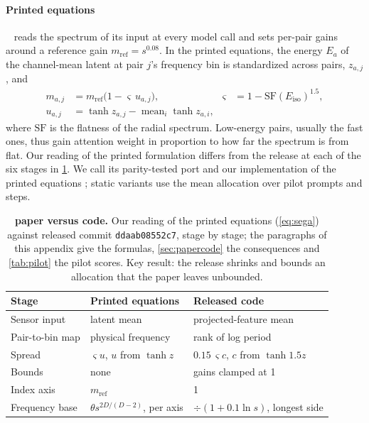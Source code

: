 \paragraph{Printed \sega{} equations}
\sega~\citep{sega2026} reads the spectrum of its input at every model call and sets per-pair gains around a reference gain $m_{\mathrm{ref}}=s^{0.08}$. In the printed equations, the energy $E_a$ of the channel-mean latent at pair $j$'s frequency bin is standardized across pairs, $z_{a,j}$, and
\begin{equation}
\begin{aligned}
m_{a,j}&=m_{\mathrm{ref}}\bigl(1-\varsigma\,u_{a,j}\bigr),
&\varsigma&=1-\mathrm{SF}(E_{\mathrm{iso}})^{1.5},\\
u_{a,j}&=\tanh z_{a,j}-\operatorname{mean}_i\tanh z_{a,i},
\end{aligned}
\label{eq:sega}
\end{equation}
where $\mathrm{SF}$ is the flatness of the radial spectrum. Low-energy pairs, usually the fast ones, thus gain attention weight in proportion to how far the spectrum is from flat. Our reading of the printed formulation differs from the release at each of the six stages in \cref{tab:papercode}. We call its parity-tested port \segaofficial{} and our implementation of the printed equations \segapaper; static variants use the mean allocation over pilot prompts and steps.

\begin{table}[!htbp]
\caption{\textbf{\sega{} paper versus code.} Our reading of the printed equations (\cref{eq:sega}) against released commit \texttt{ddaab08552c7}, stage by stage; the paragraphs of this appendix give the formulas, \cref{sec:papercode} the consequences and \cref{tab:pilot} the pilot scores. Key result: the release shrinks and bounds an allocation that the paper leaves unbounded.}
\label{tab:papercode}
\centering\footnotesize
\setlength{\tabcolsep}{6pt}
\begin{tabular}{@{}l l l@{}}
\toprule
Stage & Printed equations & Released code \\
\midrule
Sensor input & latent mean & projected-feature mean \\
Pair-to-bin map & physical frequency & rank of log period \\
Spread & $\varsigma u$, $u$ from $\tanh z$ & $0.15\,\varsigma c$, $c$ from $\tanh 1.5z$ \\
Bounds & none & gains clamped at 1 \\
Index axis & $m_{\mathrm{ref}}$ & 1 \\
Frequency base & $\theta s^{2D/(D-2)}$, per axis & $\div(1{+}0.1\ln s)$, longest side \\
\bottomrule
\end{tabular}
\end{table}

